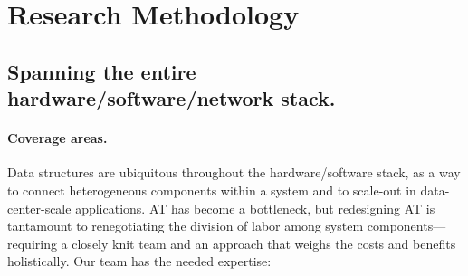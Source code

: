 \section{Research Methodology}


\subsection{Spanning the entire hardware/software/network stack.}


\paragraph{Coverage areas.} Data structures are ubiquitous throughout the
hardware/software stack, as a way to connect heterogeneous components within a
system and to scale-out in data-center-scale applications.  AT has become a
bottleneck, but redesigning AT is tantamount to renegotiating the division of
labor among system components---requiring a closely knit team and an approach
that weighs the costs and benefits holistically.
Our team has the needed expertise:

